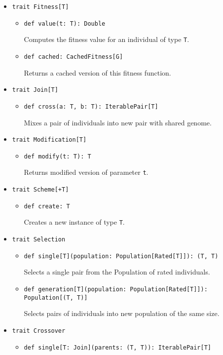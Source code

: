 \begin{itemize}
\smallskip
\item \texttt{trait Fitness[T]}
\begin{itemize}
	\item \texttt{def value(t: T): Double}
	
	Computes the fitness value for an individual of type \texttt{T}.

	\item \texttt{def cached: CachedFitness[G]}

	Returns a cached version of this fitness function.
\end{itemize}

\smallskip
\item \texttt{trait Join[T]}
\begin{itemize}
	\item \texttt{def cross(a: T, b: T): IterablePair[T]}

	Mixes a pair of individuals into new pair with shared genome.
\end{itemize}

\smallskip
\item \texttt{trait Modification[T]}
\begin{itemize}
	\item \texttt{def modify(t: T): T}

	Returns modified version of parameter \texttt{t}.
\end{itemize}

\smallskip
\item \texttt{trait Scheme[+T]}
\begin{itemize}
	\item \texttt{def create: T}

	Creates a new instance of type \texttt{T}.
\end{itemize}

\smallskip
\item \texttt{trait Selection}
\begin{itemize}
	\item \texttt{def single[T](population: Population[Rated[T]]): (T, T)}

	Selects a single pair from the Population of rated individuals.

	\item \texttt{def generation[T](population: Population[Rated[T]]): Population[(T, T)]}

	Selects pairs of individuals into new population of the same size.
\end{itemize}

\smallskip
\item \texttt{trait Crossover}
\begin{itemize}
	\item \texttt{def single[T: Join](parents: (T, T)): IterablePair[T]}


\end{itemize}
\end{itemize}

